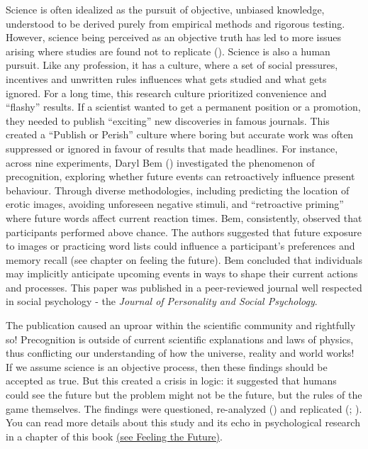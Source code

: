 \documentclass[
  letterpaper,
]{book}
\begin{document}
Science is often idealized as the pursuit of objective, unbiased
knowledge, understood to be derived purely from empirical methods and
rigorous testing. However, science being perceived as an objective truth
has led to more issues arising where studies are found not to replicate
(). Science is
also a human pursuit. Like any profession, it has a culture, where a set
of social pressures, incentives and unwritten rules influences what gets
studied and what gets ignored. For a long time, this research culture
prioritized convenience and ``flashy'' results. If a scientist wanted to
get a permanent position or a promotion, they needed to publish
``exciting'' new discoveries in famous journals. This created a
``Publish or Perish'' culture where boring but accurate work was often
suppressed or ignored in favour of results that made headlines. For
instance, across nine experiments, Daryl Bem
() investigated the phenomenon of
precognition, exploring whether future events can retroactively
influence present behaviour. Through diverse methodologies, including
predicting the location of erotic images, avoiding unforeseen negative
stimuli, and ``retroactive priming'' where future words affect current
reaction times. Bem, consistently, observed that participants performed
above chance. The authors suggested that future exposure to images or
practicing word lists could influence a participant's preferences and
memory recall (see chapter on feeling the future). Bem concluded that
individuals may implicitly anticipate upcoming events in ways to shape
their current actions and processes. This paper was published in a
peer-reviewed journal well respected in social psychology - the
\emph{Journal of Personality and Social Psychology}.

The publication caused an uproar within the scientific community and
rightfully so! Precognition is outside of current scientific
explanations and laws of physics, thus conflicting our understanding of
how the universe, reality and world works! If we assume science is an
objective process, then these findings should be accepted as true. But
this created a crisis in logic: it suggested that humans could see the
future but the problem might not be the future, but the rules of the
game themselves. The findings were questioned, re-analyzed
() and replicated
(;
). You can
read more details about this study and its echo in psychological
research in a chapter of this book \href{chapter6.qmd}{(see Feeling the
Future)}.
\end{document}
